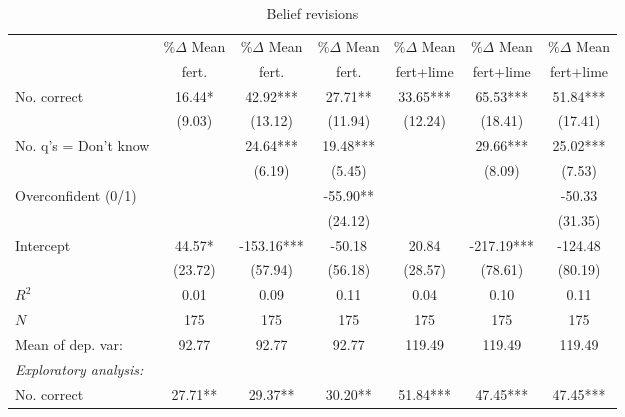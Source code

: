 \begin{table}[htbp]
\centering
\hspace*{-1.2cm}
\begin{threeparttable}
\caption{Belief revisions}
\label{tab:C2beliefs}
\begin{tabular}{l ccc ccc}
\hline
\hline
& $\%\Delta$ Mean & $\%\Delta$ Mean & $\%\Delta$ Mean & $\%\Delta$ Mean & $\%\Delta$ Mean & $\%\Delta$ Mean \\
& fert. & fert. & fert. & fert+lime & fert+lime & fert+lime \\ \hline
No. correct         &       16.44*  &       42.92***&       27.71** &       33.65***&       65.53***&       51.84***\\
                    &      (9.03)   &     (13.12)   &     (11.94)   &     (12.24)   &     (18.41)   &     (17.41)   \\
No. q's = Don't know&               &       24.64***&       19.48***&               &       29.66***&       25.02***\\
                    &               &      (6.19)   &      (5.45)   &               &      (8.09)   &      (7.53)   \\
Overconfident (0/1) &               &               &      -55.90** &               &               &      -50.33   \\
                    &               &               &     (24.12)   &               &               &     (31.35)   \\
Intercept           &       44.57*  &     -153.16***&      -50.18   &       20.84   &     -217.19***&     -124.48   \\
                    &     (23.72)   &     (57.94)   &     (56.18)   &     (28.57)   &     (78.61)   &     (80.19)   \\
\hline
$R^2$               &        0.01   &        0.09   &        0.11   &        0.04   &        0.10   &        0.11   \\
$N$                 &         175   &         175   &         175   &         175   &         175   &         175   \\
Mean of dep. var:   &       92.77   &       92.77   &       92.77   &      119.49   &      119.49   &      119.49   \\
\hline
%
%
\textit{Exploratory analysis:}&               &               &               &               &               &               \\
No. correct         &       27.71** &       29.37** &       30.20** &       51.84***&       47.45***&       47.45***\\

\end{tabular}
\end{threeparttable}
\end{table}
